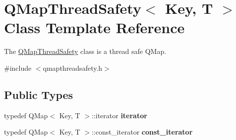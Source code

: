 \hypertarget{class_q_map_thread_safety}{}\section{Q\+Map\+Thread\+Safety$<$ Key, T $>$ Class Template Reference}
\label{class_q_map_thread_safety}


The \hyperlink{class_q_map_thread_safety}{Q\+Map\+Thread\+Safety} class is a thread safe Q\+Map.  




{\ttfamily \#include $<$qmapthreadsafety.\+h$>$}

\subsection*{Public Types}
\begin{DoxyCompactItemize}
\item 
\mbox{\label{class_q_map_thread_safety_a454c8af3f68e6d61aecaf1b918aa525b}} 
typedef Q\+Map$<$ Key, T $>$\+::iterator {\bfseries iterator}
\item 
\mbox{\label{class_q_map_thread_safety_aa58d8479729f72b33e305a4d0ca957bd}} 
typedef Q\+Map$<$ Key, T $>$\+::const\+\_\+iterator {\bfseries const\+\_\+iterator}
\end{DoxyCompactItemize}
